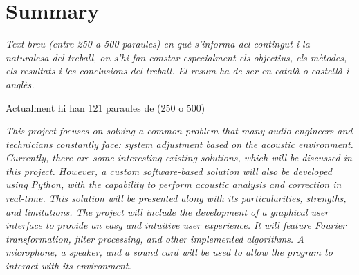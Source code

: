 \chapter*{Summary}


\textit{Text breu (entre 250 a 500 paraules) en què s'informa del contingut i la naturalesa del treball, on s'hi fan constar especialment els objectius, els mètodes, els resultats i les conclusions del treball. El resum ha de ser en català o castellà i anglès.}

Actualment hi han 121 paraules de (250 o 500)

\textit{This project focuses on solving a common problem that many audio engineers and technicians constantly face: system adjustment based on the acoustic environment. Currently, there are some interesting existing solutions, which will be discussed in this project. However, a custom software-based solution will also be developed using Python, with the capability to perform acoustic analysis and correction in real-time. This solution will be presented along with its particularities, strengths, and limitations. The project will include the development of a graphical user interface to provide an easy and intuitive user experience. It will feature Fourier transformation, filter processing, and other implemented algorithms. A microphone, a speaker, and a sound card will be used to allow the program to interact with its environment.}